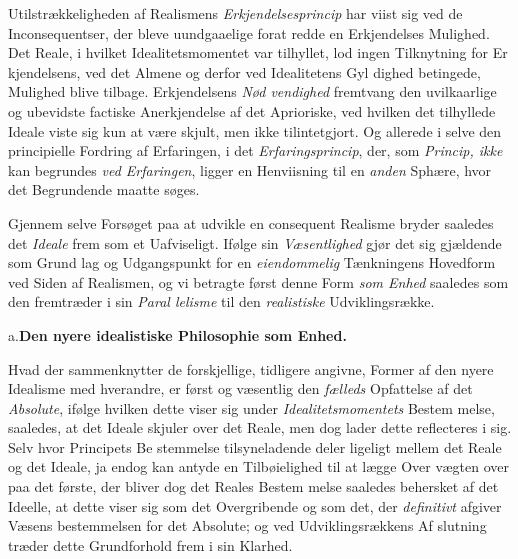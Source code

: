Utilstrækkeligheden af Realismens \emph{Erkjendelsesprincip}
har viist sig ved de Inconsequentser, der bleve uundgaaelige
forat redde en Erkjendelses Mulighed. Det Reale, i hvilket
Idealitetsmomentet var tilhyllet, lod ingen Tilknytning for Er\-%
kjendelsens, ved det Almene og derfor ved Idealitetens Gyl\-%
dighed betingede, Mulighed blive tilbage. Erkjendelsens \emph{Nød\-%
vendighed} fremtvang den uvilkaarlige og ubevidste factiske
Anerkjendelse af det Aprioriske, ved hvilken det tilhyllede
Ideale viste sig kun at være skjult, men ikke tilintetgjort.
Og allerede i selve den principielle Fordring af Erfaringen,
i det \emph{Erfaringsprincip}, der, som \emph{Princip, ikke} kan
begrundes \emph{ved Erfaringen}, ligger en Henviisning til en
\emph{anden} Sphære, hvor det Begrundende maatte søges.

Gjennem selve Forsøget paa at udvikle en consequent
Realisme bryder saaledes det \emph{Ideale} frem som et Uafviseligt.
Ifølge sin \emph{Væsentlighed} gjør det sig gjældende som Grund\-%
lag og Udgangspunkt for en \emph{eiendommelig} Tænkningens
Hovedform ved Siden af Realismen, og vi betragte først denne
Form \emph{som Enhed} saaledes som den fremtræder i sin \emph{Paral\-%
lelisme} til den \emph{realistiske} Udviklingsrække.

%
\begin{center}
a.\enspace\textbf{Den nyere idealistiske Philosophie som Enhed.}
\end{center}

Hvad der sammenknytter de forskjellige, tidligere angivne,
Former af den nyere Idealisme med hverandre, er først og
væsentlig den \emph{fælleds} Opfattelse af det \emph{Absolute}, ifølge
hvilken dette viser sig under \emph{Idealitetsmomentets} Bestem\-%
melse, saaledes, at det Ideale skjuler over det Reale, men
dog lader dette reflecteres i sig. Selv hvor Principets Be\-%
stemmelse tilsyneladende deler ligeligt mellem det Reale og det
Ideale, ja endog kan antyde en Tilbøielighed til at lægge Over\-%
vægten over paa det første, der bliver dog det Reales Bestem\-%
melse saaledes behersket af det Ideelle, at dette viser sig som
det Overgribende og som det, der \emph{definitivt} afgiver Væsens\-%
bestemmelsen for det Absolute; og ved Udviklingsrækkens Af\-%
slutning træder dette Grundforhold frem i sin Klarhed.

